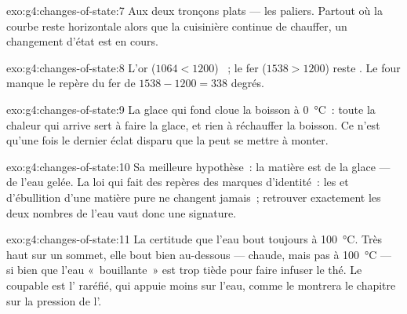 \begin{solution}{exo:g4:changes-of-state:7}
Aux deux tronçons plats --- les paliers. Partout où la courbe reste
horizontale alors que la cuisinière continue de chauffer, un
changement d'état est en cours.
\end{solution}

\begin{solution}{exo:g4:changes-of-state:8}
L'or ($1064 < 1200$) ~; le fer ($1538 > 1200$) reste . Le
four manque le repère du fer de $1538 - 1200 = 338$ degrés.
\end{solution}

\begin{solution}{exo:g4:changes-of-state:9}
La glace qui fond cloue la boisson à \qty{0}{\celsius}~: toute la
chaleur qui arrive sert à faire  la glace, et rien à réchauffer
la boisson. Ce n'est qu'une fois le dernier éclat disparu que la
 peut se mettre à monter.
\end{solution}

\begin{solution}{exo:g4:changes-of-state:10}
Sa meilleure hypothèse~: la matière est de la glace --- de l'eau
gelée. La loi qui fait des repères des marques d'identité~: les
 et d'ébullition d'une matière pure ne changent
jamais~; retrouver exactement les deux nombres de l'eau vaut donc une
signature.
\end{solution}

\begin{solution}{exo:g4:changes-of-state:11}
La certitude que l'eau bout toujours à \qty{100}{\celsius}. Très haut
sur un sommet, elle bout bien au-dessous --- chaude, mais pas à
\qty{100}{\celsius} --- si bien que l'eau «~bouillante~» est trop
tiède pour faire infuser le thé. Le coupable est l' raréfié, qui
appuie moins sur l'eau, comme le montrera le chapitre sur la pression
de l'.
\end{solution}
